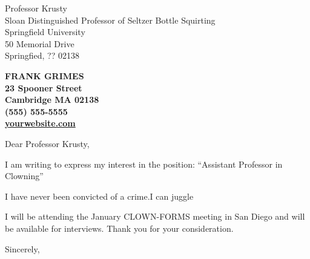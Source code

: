 \documentclass[11pt]{letter}
\begin{document}
\begin{letter}{  Professor Krusty
                    \\ Sloan Distinguished Professor of Seltzer Bottle Squirting 
                    \\ Springfield University
                    \\ 50 Memorial Drive 
                    \\ Springfied, ?? 02138   } 

\begin{center}
 \large\bf FRANK GRIMES \\ %
  23 Spooner Street \\ Cambridge MA 02138 \\ (555) 555-5555 \\ \small \href{http://www.yourwebsite.com}{yourwebsite.com} %
 \end{center} 
\vfill

\opening{Dear Professor Krusty,} 


I am writing to express my interest in the position: ``Assistant Professor in Clowning'' 

I have never been convicted of a crime.I can juggle
 
I will be attending the January CLOWN-FORMS meeting in San Diego and will be available for interviews. 
Thank you for your consideration. 


\closing{Sincerely, \\[0.0in]
 \\
}

\end{letter}
\end{document}

